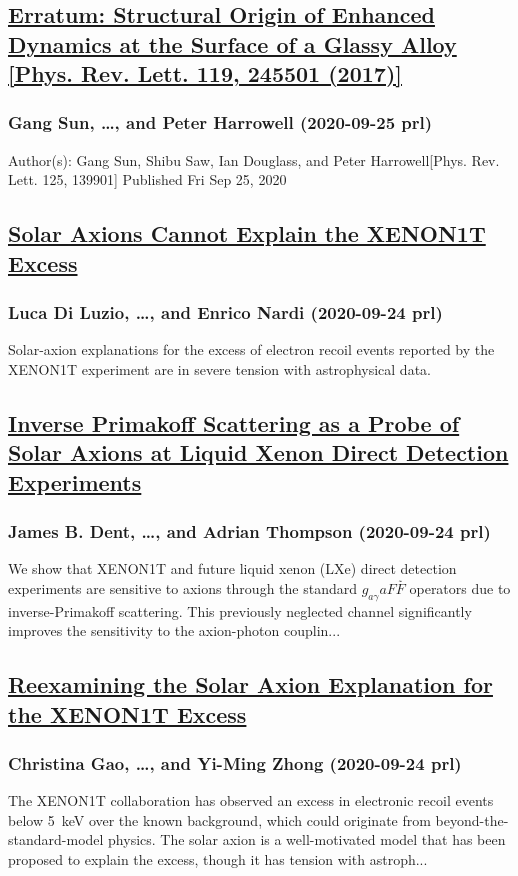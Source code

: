 \subsection*{\href{http://link.aps.org/doi/10.1103/PhysRevLett.125.139901}{Erratum: Structural Origin of Enhanced Dynamics at the Surface of a Glassy Alloy [Phys. Rev. Lett. 119, 245501 (2017)]}}
\subsubsection*{Gang Sun, \dots, and Peter Harrowell (2020-09-25 prl)}
Author(s): Gang Sun, Shibu Saw, Ian Douglass, and Peter Harrowell[Phys. Rev. Lett. 125, 139901] Published Fri Sep 25, 2020
\subsection*{\href{http://link.aps.org/doi/10.1103/PhysRevLett.125.131804}{Solar Axions Cannot Explain the XENON1T Excess}}
\subsubsection*{Luca Di Luzio, \dots, and Enrico Nardi (2020-09-24 prl)}
Solar-axion explanations for the excess of electron recoil events reported by the XENON1T experiment are in severe tension with astrophysical data.
\subsection*{\href{http://link.aps.org/doi/10.1103/PhysRevLett.125.131805}{Inverse Primakoff Scattering as a Probe of Solar Axions at Liquid Xenon Direct Detection Experiments}}
\subsubsection*{James B. Dent, \dots, and Adrian Thompson (2020-09-24 prl)}
We show that XENON1T and future liquid xenon (LXe) direct detection experiments are sensitive to axions through the standard ${g}_{aγ}aF\stackrel{˜}{F}$ operators due to inverse-Primakoff scattering. This previously neglected channel significantly improves the sensitivity to the axion-photon couplin...
\subsection*{\href{http://link.aps.org/doi/10.1103/PhysRevLett.125.131806}{Reexamining the Solar Axion Explanation for the XENON1T Excess}}
\subsubsection*{Christina Gao, \dots, and Yi-Ming Zhong (2020-09-24 prl)}
The XENON1T collaboration has observed an excess in electronic recoil events below 5 keV over the known background, which could originate from beyond-the-standard-model physics. The solar axion is a well-motivated model that has been proposed to explain the excess, though it has tension with astroph...
